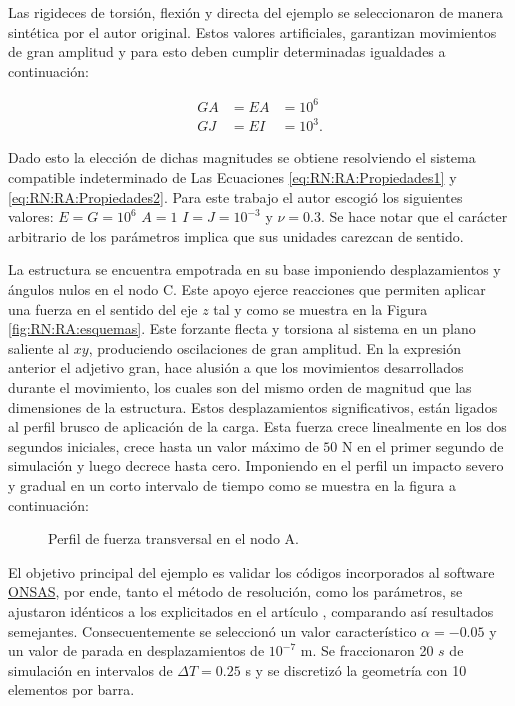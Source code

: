Las rigideces de torsión, flexión y directa del ejemplo se seleccionaron de manera sintética por el autor original. Estos valores artificiales, garantizan movimientos de gran amplitud y para esto deben cumplir determinadas igualdades a continuación:

\begin{eqnarray}
	\label{eq:RN:RA:Propiedades1}
	GA &= EA& =10^6\\
	\label{eq:RN:RA:Propiedades2}
	GJ &= EI& =10^3.
\end{eqnarray}

Dado esto la elección de dichas magnitudes se obtiene resolviendo el sistema compatible indeterminado de Las Ecuaciones \eqref{eq:RN:RA:Propiedades1} y \eqref{eq:RN:RA:Propiedades2}. Para este trabajo el autor escogió los siguientes valores: $ E=G=10^6$ $A=1 $  $I=J=10^{-3}$ y $\nu=0.3$. Se hace notar que el carácter arbitrario de los parámetros implica que sus unidades carezcan de sentido. 


La estructura se encuentra empotrada en su base imponiendo desplazamientos y ángulos nulos en el nodo C. Este apoyo ejerce reacciones que permiten aplicar una fuerza en el sentido del eje $z$ tal y como se muestra en la Figura \ref{fig:RN:RA:esquemas}. Este forzante flecta y torsiona al sistema en un plano saliente al $xy$, produciendo oscilaciones de gran amplitud. En la expresión anterior el adjetivo gran, hace alusión a que los movimientos desarrollados durante el movimiento, los cuales son del mismo orden de magnitud que las dimensiones de la estructura. Estos desplazamientos significativos, están ligados al perfil brusco de aplicación de la carga. Esta fuerza crece linealmente en los dos segundos iniciales, crece hasta un valor máximo de $50$ N en el primer segundo de simulación y luego decrece hasta cero. Imponiendo en el perfil un impacto severo y gradual en un corto intervalo de tiempo como se muestra en la figura a continuación: 

\begin{figure}[htbp]
	\centering
	\def\svgwidth{80mm}
	
	\caption{Perfil de fuerza transversal en el nodo A.}
	\label{fig:RN:RA:Force}
\end{figure}

El objetivo principal del ejemplo es validar los códigos incorporados al software \href{https://github.com/ONSAS/ONSAS/}{ONSAS}, por ende, tanto el método de resolución, como los parámetros, se ajustaron idénticos a los explicitados en el artículo \cite{Le2014}, comparando así resultados semejantes. Consecuentemente se seleccionó un valor característico $\alpha=-0.05$ y un valor de parada en desplazamientos de $10^{-7}$ m. Se fraccionaron 20 $s$ de simulación en intervalos de $\Delta T=0.25$ s y se discretizó la geometría con 10 elementos por barra.

